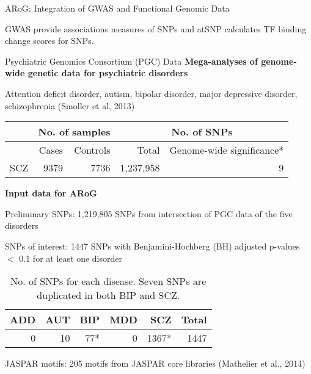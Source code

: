 \documentclass[final]{beamer}
\begin{document}
\begin{frame}{}
\begin{columns}[t]
\begin{column}{1\linewidth}
\begin{columns}
\begin{column}{.38\textwidth}
\begin{block}{ARoG: Integration of GWAS and Functional Genomic Data}
\bi
\item GWAS provide associations measures of SNPs and atSNP calculates TF binding change scores for SNPs.
\ei

\end{block}

\begin{block}{Psychiatric Genomics Consortium (PGC) Data} %
{\color{orange!100} \textbf{Mega-analyses of genome-wide genetic data for psychiatric disorders}} %
\centering
\bi
\item Attention deficit disorder, autism, bipolar disorder, major depressive disorder, schizophrenia (Smoller et al, 2013)
\begin{table}
{\small
 \begin{tabular}{l|rr|rr}
 \hline
 &  \multicolumn{2}{c|}{No. of samples} & \multicolumn{2}{c}{No. of SNPs}\\
 \hline
 &Cases &  Controls & Total & {\color{red} Genome-wide significance*}\\
 \hline
SCZ & 9379 & 7736& 1,237,958&9\\
 \hline
\end{tabular}
}
\end{table}
\ei
 
 {\color{orange!100} \textbf{ {\color{orange!100} \textbf{Input data for ARoG}}}}
\centering
\bi
\item Preliminary SNPs: 1,219,805 SNPs from intersection of PGC data of the five disorders
\item SNPs of interest: 1447 SNPs with Benjamini-Hochberg (BH) adjusted p-values $<$ 0.1 for at least one disorder
\begin{table}
\centering
{\small
 \begin{tabular}{rrrrrr}
 \hline
 ADD &  AUT & BIP & MDD &SCZ & Total \\
 \hline
 0 & 10& 77* & 0 &1367* & 1447\\
 \hline
\end{tabular}
\caption{No. of SNPs for each disease. Seven SNPs are duplicated in both BIP and SCZ.}
}
\end{table}
\item JASPAR motifs: 205 motifs from JASPAR core libraries (Mathelier et al., 2014)
\ei

 


\end{block}
\end{column}
\end{columns}
\end{column}
\end{columns}
\end{frame}
\end{document}
